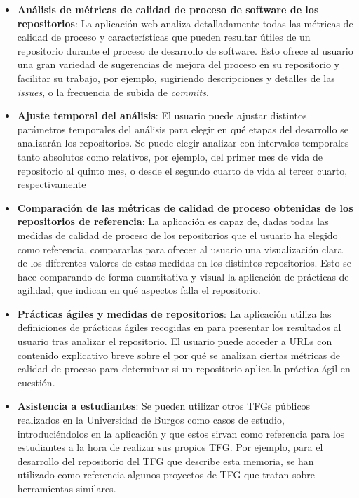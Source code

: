 \begin{itemize}
    \item \textbf{Análisis de métricas de calidad de proceso de software de los repositorios}: La aplicación web analiza detalladamente todas las métricas de calidad de proceso y características que pueden resultar útiles de un repositorio durante el proceso de desarrollo de software. Esto ofrece al usuario una gran variedad de sugerencias de mejora del proceso en su repositorio y facilitar su trabajo, por ejemplo, sugiriendo descripciones y detalles de las \textit{issues}, o la frecuencia de subida de \textit{commits}.

    \item \textbf{Ajuste temporal del análisis}: El usuario puede ajustar distintos parámetros temporales del análisis para elegir en qué etapas del desarrollo se analizarán los repositorios. Se puede elegir analizar con intervalos temporales tanto absolutos como relativos, por ejemplo, del primer mes de vida de repositorio al quinto mes, o desde el segundo cuarto de vida al tercer cuarto, respectivamente
    
    \item \textbf{Comparación de las métricas de calidad de proceso obtenidas de los repositorios de referencia}: La aplicación es capaz de, dadas todas las medidas de calidad de proceso de los repositorios que el usuario ha elegido como referencia, compararlas para ofrecer al usuario una visualización clara de los diferentes valores de estas medidas en los distintos repositorios. Esto se hace comparando de forma cuantitativa y visual la aplicación de prácticas de agilidad, que indican en qué aspectos falla el repositorio.
    
    \item \textbf{Prácticas ágiles y medidas de repositorios}: La aplicación utiliza las definiciones de prácticas ágiles recogidas en \cite{agileSubwayMap} para presentar los resultados al usuario tras analizar el repositorio. El usuario puede acceder a URLs con contenido explicativo breve sobre el por qué se analizan ciertas métricas de calidad de proceso para determinar si un repositorio aplica la práctica ágil en cuestión.

    \item \textbf{Asistencia a estudiantes}: Se pueden utilizar otros TFGs públicos realizados en la Universidad de Burgos como casos de estudio, introduciéndolos en la aplicación y que estos sirvan como referencia para los estudiantes a la hora de realizar sus propios TFG. Por ejemplo, para el desarrollo del repositorio del TFG que describe esta memoria, se han utilizado como referencia algunos proyectos de TFG que tratan sobre herramientas similares.
    

\end{itemize}


